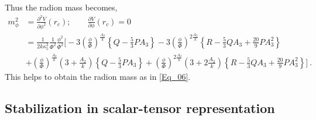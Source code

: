 \documentclass{article}
\begin{document}
Thus the radion mass becomes,
\begin{align}
m_{\phi}^{2}&=\frac{\partial ^{2}V}{\partial \phi ^{2}}(r_{c});\qquad \frac{\partial V}{\partial \phi}(r_{c}) =0
\nonumber
\\
&=\frac{1}{2k\kappa _{5}^{2}}\frac{1}{\Phi^{2}}\frac{\phi ^{2}}{\Phi^{2}}\Bigg[-3\left(\frac{\phi}{\Phi}\right)^{\frac{A_{2}}{k}}\left\lbrace Q-\frac{5}{3}PA_{3} \right\rbrace -3\left(\frac{\phi}{\Phi}\right)^{2\frac{A_{2}}{k}}\left\lbrace R-\frac{5}{3}QA_{3}+\frac{20}{9}PA_{3}^{2}\right\rbrace
\nonumber
\\
&+\left(\frac{\phi}{\Phi}\right)^{\frac{A_{2}}{k}}\left(3+\frac{A_{2}}{k}\right)\left\lbrace Q-\frac{5}{3}PA_{3} \right\rbrace
+\left(\frac{\phi}{\Phi}\right)^{2\frac{A_{2}}{k}}\left(3+2\frac{A_{2}}{k}\right)\left\lbrace R-\frac{5}{3}QA_{3}+\frac{20}{9}PA_{3}^{2}\right\rbrace \Bigg]~.
\end{align}
This helps to obtain the radion mass as in \ref{Eq_06}.
\subsection{Stabilization in scalar-tensor representation}
\end{document}
